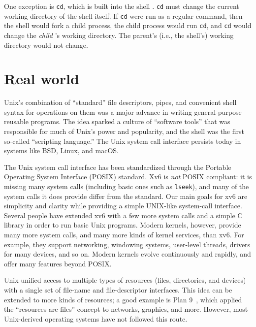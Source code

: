 One exception is
\lstinline{cd},
which is built into the shell
.
\lstinline{cd}
must change the current working directory of the
shell itself.  If
\lstinline{cd}
were run as a regular command, then the shell would fork a child
process, the child process would run
\lstinline{cd},
and
\lstinline{cd}
would change the 
\textit{child} 's 
working directory.  The parent's (i.e.,
the shell's) working directory would not change.
\section{Real world}

Unix's combination of ``standard'' file
descriptors, pipes, and convenient shell syntax for
operations on them was a major advance in writing
general-purpose reusable programs.
The idea sparked a culture of ``software tools'' that was
responsible for much of Unix's power and popularity,
and the shell was the first so-called ``scripting language.''
The Unix system call interface persists today in systems like
BSD, Linux, and macOS.

The Unix system call interface has been standardized through the Portable
Operating System Interface (POSIX) standard.
Xv6 is
\textit{not}
POSIX compliant:  it is missing many system calls (including basic ones such as
\lstinline{lseek}),
and many of the system calls it does provide differ from the standard.
Our main goals for xv6 are
simplicity and clarity while providing a simple UNIX-like system-call interface.
Several people have extended xv6 with a few more system calls and a simple
C library in order to run basic Unix programs.  Modern kernels, however,
provide many more system calls, and many more kinds of kernel services, than
xv6.  For example, they support networking, windowing systems, user-level threads,
drivers for many devices, and so on.  Modern kernels evolve continuously and
rapidly, and offer many features beyond POSIX.

Unix unified access to multiple types of resources (files,
directories, and devices) with a single set of 
file-name and file-descriptor interfaces.
This idea can be extended to more kinds of resources;
a good example is Plan 9~\cite{Presotto91plan9},
which applied the ``resources are files''
concept to 
networks, graphics, and more.
However, most Unix-derived operating systems have
not followed this route.

